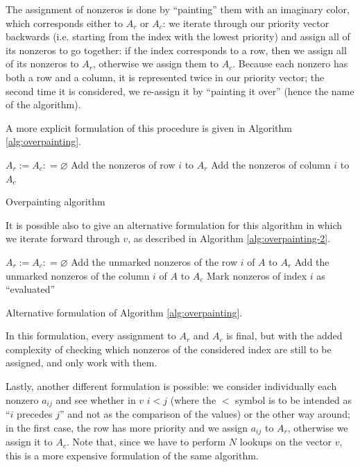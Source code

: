 The assignment of nonzeros is done by ``painting'' them with an imaginary color, which corresponds either to $A_r$ or $A_c$: we iterate through our priority vector backwards (i.e. starting from the index with the lowest priority) and assign all of its nonzeros to go together: if the index corresponds to a row, then we assign all of its nonzeros to $A_r$, otherwise we assign them to $A_c$. Because each nonzero has both a row and a column, it is represented twice in our priority vector; the second time it is considered, we re-assign it by ``painting it over'' (hence the name of the algorithm).

A more explicit formulation of this procedure is given in Algorithm \ref{alg:overpainting}.

\begin{algorithm}[h]
	\begin{algorithmic}
		\State $A_r := A_c: = \varnothing$
		\State Add the nonzeros of row $i$ to $A_r$
		\Else
		\State Add the nonzeros of column $i$ to $A_c$
		\EndIf
		\EndFor
	\end{algorithmic}
	\caption{Overpainting algorithm} \label{alg:overpainting}
\end{algorithm}

It is possible also to give an alternative formulation for this algorithm in which we iterate forward through $v$, as described in Algorithm \ref{alg:overpainting-2}.

\begin{algorithm}[h]
	\begin{algorithmic}
		\Require{Priority vector $v$, matrix $A$}
		\Ensure{$A_r$, $A_c$}
		\State $A_r := A_c: = \varnothing$
		\For{$i=0,\dots,m+n-1$}
		\If{$v_i < m$}
		\State Add the unmarked nonzeros of the row $i$ of $A$ to $A_r$
		\Else
		\State Add the unmarked nonzeros of the column $i$ of $A$ to $A_c$
		\EndIf
		\State Mark nonzeros of index $i$ as ``evaluated''
		\EndFor
	\end{algorithmic}
	\caption{Alternative formulation of Algorithm \ref{alg:overpainting}.} \label{alg:overpainting-2}
\end{algorithm}

In this formulation, every assignment to $A_r$ and $A_c$ is final, but with the added complexity of checking which nonzeros of the considered index are still to be assigned, and only work with them.

Lastly, another different formulation is possible: we consider individually each nonzero $a_{ij}$ and see whether in $v$ $i < j$ (where the $<$ symbol is to be intended as ``$i$ precedes $j$'' and not as the comparison of the values) or the other way around; in the first case, the row has more priority and we assign $a_{ij}$ to $A_r$, otherwise we assign it to $A_c$. Note that, since we have to perform $N$ lookups on the vector $v$, this is a more expensive formulation of the same algorithm.

